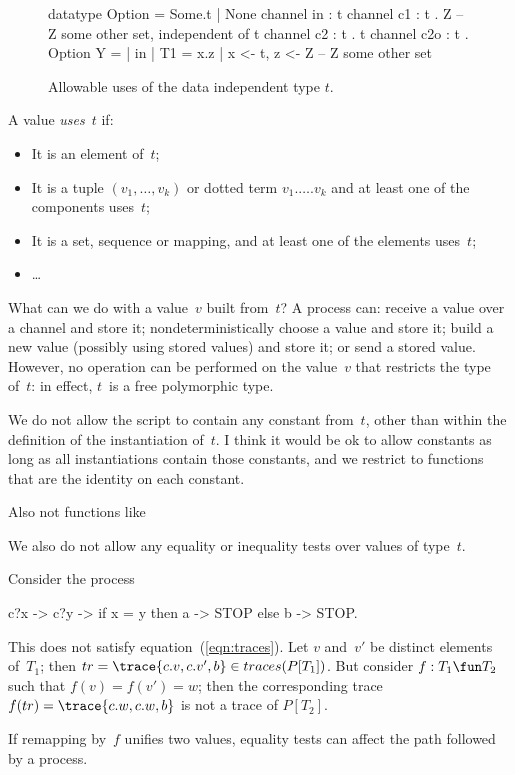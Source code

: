 
\begin{figure}[th]
\begin{cspm}
datatype Option = Some.t | None
channel in : t
channel c1 : t . Z -- Z some other set, independent of t
channel c2 : t . t
channel c2o : t . Option
Y = {| in |}
T1 = { x.z | x <- t, z <- Z } -- Z some other set
\end{cspm}
\caption{Allowable uses of the data independent type $t$. \label{fig:t-allowed}}
\end{figure}


\begin{definition}
A value \emph{uses}~$t$ if:
\begin{itemize}
\item It is an element of~$t$;

\item It is a tuple $(v_1,\ldots,v_k)$ or dotted term $v_1.\ldots.v_k$ and at
least one of the components uses~$t$;

\item It is a set, sequence or mapping, and at least one of the elements
uses~$t$; 

\item \ldots
\end{itemize}
\end{definition}


What can we do with a value~$v$ built from~$t$?  A process can: receive a
value over a channel and store it; nondeterministically choose a value and
store it; build a new value (possibly using stored values) and store it; or
send a stored value.  However, no operation can be performed on the value~$v$
that restricts the type of~$t$: in effect, $t$~is a free polymorphic type.

We do not allow the script to contain any constant from~$t$, other than within
the definition of the instantiation of~$t$.  \framebox{**} I
think it would be ok to allow constants as long as all instantiations contain
those constants, and we restrict to functions that are the identity on each
constant. 

Also not functions like  \framebox{\ldots}

We also do not allow any equality or inequality tests over values of type~$t$.
%
\begin{example}
Consider the process
\begin{cspm}
c?x -> c?y -> if x = y then a -> STOP else b -> STOP.
\end{cspm}
%
This does not satisfy equation~(\ref{eqn:traces}).  Let $v$ and~$v'$ be distinct
elements of~$T_1$; then $tr = \trace{c.v, c.v', b} \in traces(P[T_1])$.  But
consider $f: T_1 \fun T_2$ such that $f(v) = f(v') = w$; then the
corresponding trace $f(tr) = \trace{c.w, c.w, b}$ is not a trace of
$P[T_2]$.  
\end{example}
%
If remapping by~$f$ unifies two values, equality tests can affect
the path followed by a process. 

